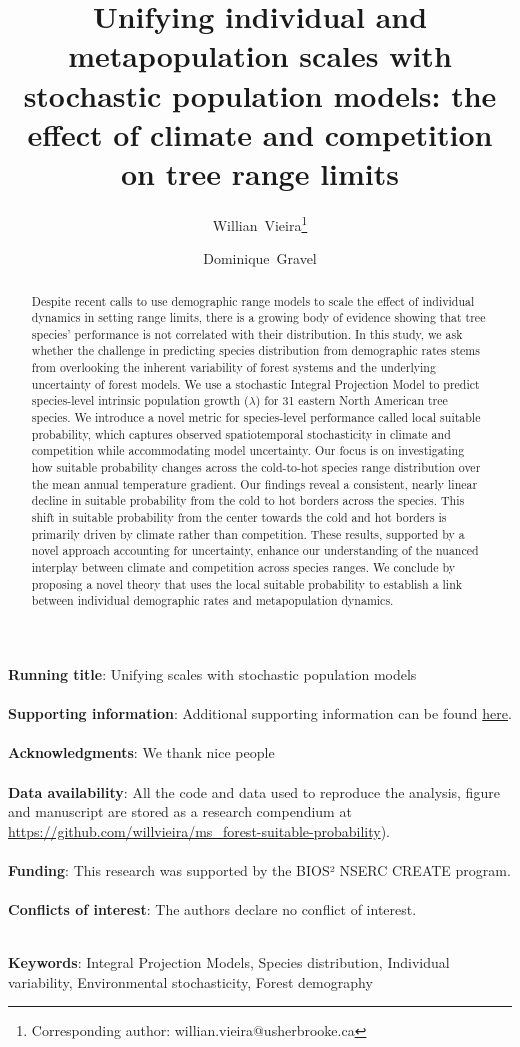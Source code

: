 \documentclass[12pt]{article}
\title{Unifying individual and metapopulation scales with stochastic
population models: the effect of climate and competition on tree range
limits}
\author[1]{Willian~Vieira\thanks{Corresponding author: willian.vieira@usherbrooke.ca}}
\author[1]{Dominique~Gravel}
\affil[1]{Département de biologie, Université de Sherbrooke, Sherbrooke,
Québec, Canada}
\date{}
\begin{document}
\maketitle
\small{{\bf Running title}: Unifying scales with stochastic population
models}\\\\
\small{{\bf Supporting information}: Additional supporting information can be found \href{https://willvieira.github.io/ms\_forest-suitable-probability/suppInfo.pdf}{here}.}\\\\
\small{{\bf Acknowledgments}: We thank nice people}\\\\
\small{{\bf Data availability}: All the code and data used to reproduce
the analysis, figure and manuscript are stored as a research compendium
at
\url{https://github.com/willvieira/ms_forest-suitable-probability}).}\\\\
\small{{\bf Funding}: This research was supported by the BIOS² NSERC
CREATE program.}\\\\
\small{{\bf Conflicts of interest}: The authors declare no conflict of
interest.}\\\\
\begin{abstract}
Despite recent calls to use demographic range models to scale the effect
of individual dynamics in setting range limits, there is a growing body
of evidence showing that tree species' performance is not correlated
with their distribution. In this study, we ask whether the challenge in
predicting species distribution from demographic rates stems from
overlooking the inherent variability of forest systems and the
underlying uncertainty of forest models. We use a stochastic Integral
Projection Model to predict species-level intrinsic population growth
(\(\lambda\)) for 31 eastern North American tree species. We introduce a
novel metric for species-level performance called local suitable
probability, which captures observed spatiotemporal stochasticity in
climate and competition while accommodating model uncertainty. Our focus
is on investigating how suitable probability changes across the
cold-to-hot species range distribution over the mean annual temperature
gradient. Our findings reveal a consistent, nearly linear decline in
suitable probability from the cold to hot borders across the species.
This shift in suitable probability from the center towards the cold and
hot borders is primarily driven by climate rather than competition.
These results, supported by a novel approach accounting for uncertainty,
enhance our understanding of the nuanced interplay between climate and
competition across species ranges. We conclude by proposing a novel
theory that uses the local suitable probability to establish a link
between individual demographic rates and metapopulation dynamics.
\end{abstract}
\hspace{1cm}\small{{\bf Keywords}: Integral Projection Models, Species
distribution, Individual variability, Environmental
stochasticity, Forest demography}
\end{document}

